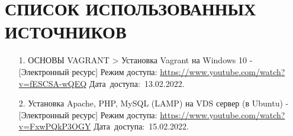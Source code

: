 \documentclass[12pt, a4paper, simple]{eskdtext}
\begin{document}
    \newpage
    \section*{СПИСОК ИСПОЛЬЗОВАННЫХ ИСТОЧНИКОВ}
    \begin{enumerate}
        \item[1.] ОСНОВЫ VAGRANT > Установка Vagrant на Windows 10 - [Электронный ресурс]
        Режим доступа: \url{https://www.youtube.com/watch?v=fESCSA-wQEQ}
        Дата~доступа:~13.02.2022.
        \item[2.] Установка Apache, PHP, MySQL (LAMP) на VDS сервер (в Ubuntu) - [Электронный ресурс]
        Режим доступа: \url{https://www.youtube.com/watch?v=FxwPQkP3OGY}
        Дата~доступа:~15.02.2022.
    \end{enumerate}
    \newpage
\end{document}
